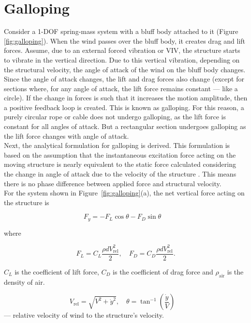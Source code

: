 \documentclass[../main]{subfiles}
\begin{document}
\section{Galloping}
\label{section: Galloping}

Consider a 1-DOF spring-mass system with a bluff body attached to it (Figure \ref{fig:galloping}). When the wind passes over the bluff body, it creates drag and lift forces. 
Assume, due to an external forced vibration or VIV, the structure starts to vibrate in the vertical direction. Due to this vertical vibration, 
depending on the structural velocity, the angle of attack of the wind on the bluff body changes. 
Since the angle of attack changes, the lift and drag forces also change (except for sections where, for any angle of attack, the lift force remains constant — like a circle).
If the change in forces is such that it increases the motion amplitude, then a positive feedback loop is created. This is known as galloping. 
For this reason, a purely circular rope or cable does not undergo galloping, as the lift force is constant for all angles of attack. 
But a rectangular section undergoes galloping as the lift force changes with angle of attack. \\

Next, the analytical formulation for galloping is derived. This formulation is based on the assumption that the instantaneous excitation 
force acting on the moving structure is nearly equivalent to the static force calculated considering the change in angle of attack due to the 
velocity of the structure \cite{NaudascherRockwell1994}. This means there is no phase difference between applied force and structural velocity. \\

For the system shown in Figure~\ref{fig:galloping}(a), the net vertical force acting on the structure is

\begin{equation}
F_y = -F_L \cos \theta - F_D \sin \theta \quad 
\end{equation}

where

\[
F_L = C_L \frac{\rho d V_{\mathrm{rel}}^2}{2}, \quad F_D = C_D \frac{\rho d V_{\mathrm{rel}}^2}{2}.
\]

\(C_L\) is the coefficient of lift force, \(C_D\) is the coefficient of drag force and \(\rho_{\mathrm{air}}\) is the density of air. 

\[
V_{\mathrm{rel}} = \sqrt{V^2 + \dot{y}^2}, \quad \theta = \tan^{-1}\left(\frac{\dot{y}}{V}\right) \quad
\] — relative velocity of wind to the structure's velocity.
\end{document}
